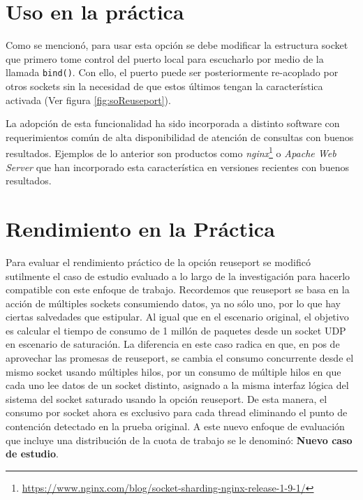 \section{Uso en la práctica}
Como se mencionó, para usar esta opción se debe modificar la estructura socket que primero tome control del puerto local para escucharlo por medio de la llamada \verb=bind()=. Con ello, el puerto puede ser posteriormente re-acoplado por otros sockets sin la necesidad de que estos últimos tengan la característica activada (Ver figura \ref{fig:soReuseport}).

La adopción de esta funcionalidad ha sido incorporada a distinto software con requerimientos común de alta disponibilidad de atención de consultas con buenos resultados. Ejemplos de lo anterior son productos como \emph{nginx}\footnote{\url{https://www.nginx.com/blog/socket-sharding-nginx-release-1-9-1/}} o \emph{Apache Web Server} \cite{paper:apache} que han incorporado esta característica en versiones recientes con buenos resultados.


\section{Rendimiento en la Práctica}
Para evaluar el rendimiento práctico de la opción reuseport se modificó sutilmente el caso de estudio evaluado a lo largo de la investigación para hacerlo compatible con este enfoque de trabajo. Recordemos que reuseport se basa en la acción de múltiples sockets consumiendo datos, ya no sólo uno, por lo que hay ciertas salvedades que estipular. Al igual que en el escenario original, el objetivo es calcular el tiempo de consumo de 1 millón de paquetes desde un socket UDP en escenario de saturación. La diferencia en este caso radica en que, en pos de aprovechar las promesas de reuseport, se cambia el consumo concurrente desde el mismo socket usando múltiples hilos, por un consumo de múltiple hilos en que cada uno lee datos de un socket distinto, asignado a la misma interfaz lógica del sistema del socket saturado usando la opción reuseport. De esta manera, el consumo por socket ahora es exclusivo para cada thread eliminando el punto de contención detectado en la prueba original. A este nuevo enfoque de evaluación que incluye una distribución de la cuota de trabajo se le denominó: \textbf{Nuevo caso de estudio}.

